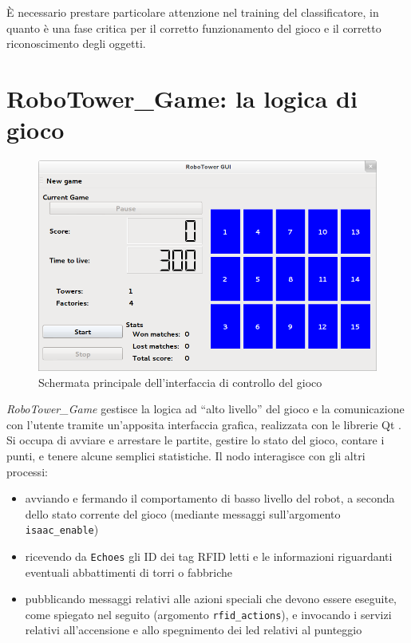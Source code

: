 
\begin{nota}
È necessario prestare particolare attenzione nel training del classificatore, in quanto è una fase critica per il corretto funzionamento del gioco e il corretto riconoscimento degli oggetti. %
\end{nota}

\section{RoboTower\_Game: la logica di gioco}
\begin{figure}
\centering
\includegraphics[scale=0.4]{images/rtgame}
\caption{Schermata principale dell'interfaccia di controllo del gioco}
\end{figure}

\emph{RoboTower\_Game} gestisce la logica ad ``alto livello'' del gioco e la comunicazione con l'utente tramite un'apposita interfaccia grafica, realizzata con le librerie Qt \cite{qtweb}. Si occupa di avviare e arrestare le partite, gestire lo stato del gioco, contare i punti, e tenere alcune semplici statistiche. Il nodo interagisce con gli altri processi:

\begin{itemize}
\item avviando e fermando il comportamento di basso livello del robot, a seconda dello stato corrente del gioco (mediante messaggi sull'argomento \verb|isaac_enable|)
\item ricevendo da \verb|Echoes| gli ID dei tag RFID letti e le informazioni riguardanti eventuali abbattimenti di torri o fabbriche
\item pubblicando messaggi relativi alle azioni speciali che devono essere eseguite, come spiegato nel seguito (argomento \verb|rfid_actions|), e invocando i servizi relativi all'accensione e allo spegnimento dei led relativi al punteggio
\end{itemize}

